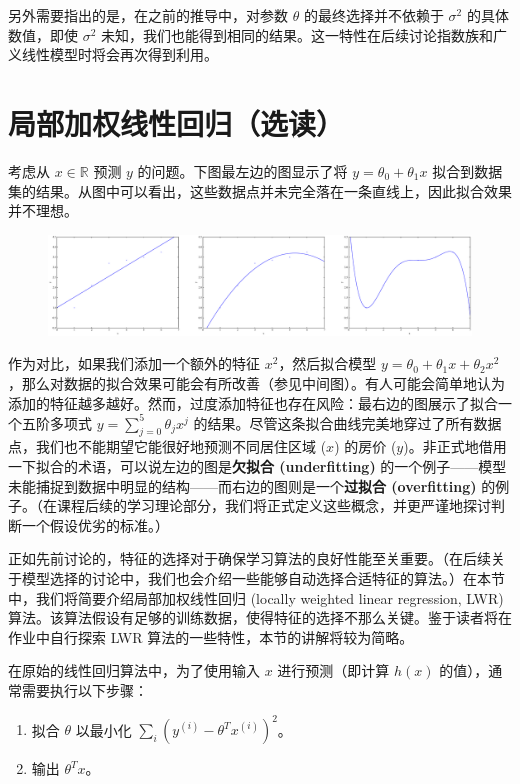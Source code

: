 另外需要指出的是，在之前的推导中，对参数 $\theta$ 的最终选择并不依赖于 $\sigma^2$ 的具体数值，即使 $\sigma^2$ 未知，我们也能得到相同的结果。这一特性在后续讨论指数族和广义线性模型时将会再次得到利用。


\section{局部加权线性回归（选读）}

考虑从 $x \in \mathbb{R}$ 预测 $y$ 的问题。下图最左边的图显示了将 $y = \theta_0 + \theta_1x$ 拟合到数据集的结果。从图中可以看出，这些数据点并未完全落在一条直线上，因此拟合效果并不理想。

\begin{figure}[H]
  \centering
  \includegraphics[width=0.93\linewidth]{figs/regression_plot.pdf}
\end{figure}

作为对比，如果我们添加一个额外的特征 $x^2$，然后拟合模型 $y = \theta_0 + \theta_1 x + \theta_2 x^2$，那么对数据的拟合效果可能会有所改善（参见中间图）。有人可能会简单地认为添加的特征越多越好。然而，过度添加特征也存在风险：最右边的图展示了拟合一个五阶多项式 $y = \sum_{j=0}^5 \theta_j x^j$ 的结果。尽管这条拟合曲线完美地穿过了所有数据点，我们也不能期望它能很好地预测不同居住区域 ($x$) 的房价 ($y$)。非正式地借用一下拟合的术语，可以说左边的图是\textbf{欠拟合 (underfitting)} 的一个例子——模型未能捕捉到数据中明显的结构——而右边的图则是一个\textbf{过拟合 (overfitting)} 的例子。（在课程后续的学习理论部分，我们将正式定义这些概念，并更严谨地探讨判断一个假设优劣的标准。）

正如先前讨论的，特征的选择对于确保学习算法的良好性能至关重要。（在后续关于模型选择的讨论中，我们也会介绍一些能够自动选择合适特征的算法。）在本节中，我们将简要介绍局部加权线性回归 (locally weighted linear regression, LWR) 算法。该算法假设有足够的训练数据，使得特征的选择不那么关键。鉴于读者将在作业中自行探索 LWR 算法的一些特性，本节的讲解将较为简略。

在原始的线性回归算法中，为了使用输入 $x$ 进行预测（即计算 $h(x)$ 的值），通常需要执行以下步骤：

\begin{enumerate}
    \item 拟合 $\theta$ 以最小化 $\sum_i (y^{(i)} - \theta^T x^{(i)})^2$。
    \item 输出 $\theta^T x$。
\end{enumerate}

